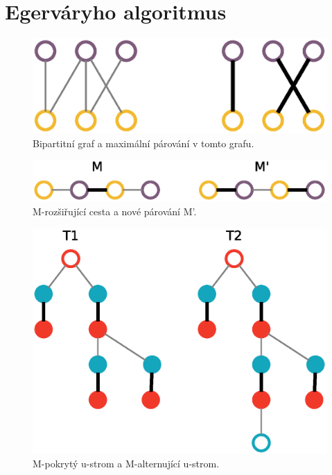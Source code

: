 \documentclass[a4paper, 11pt, titlepage, final]{article}[3. prosinec 2011]
\begin{document}
\section{Egerváryho algoritmus}


\begin{figure}[ht]
  \centering
  \includegraphics[scale=0.5]{img/bipartite.eps}
  \caption{Bipartitní graf a maximální párování v tomto grafu.}
  \label{imgBipartite}
\end{figure}

\begin{figure}[ht]
  \centering
  \includegraphics[scale=0.5]{img/mpath.eps}
  \caption{M-rozšiřující cesta a nové párování M'.}
  \label{imgPath}
\end{figure}

\begin{figure}[ht]
  \centering
  \includegraphics[scale=0.5]{img/trees.eps}
  \caption{M-pokrytý u-strom a M-alternující u-strom.}
  \label{imgTrees}
\end{figure}
\end{document}
